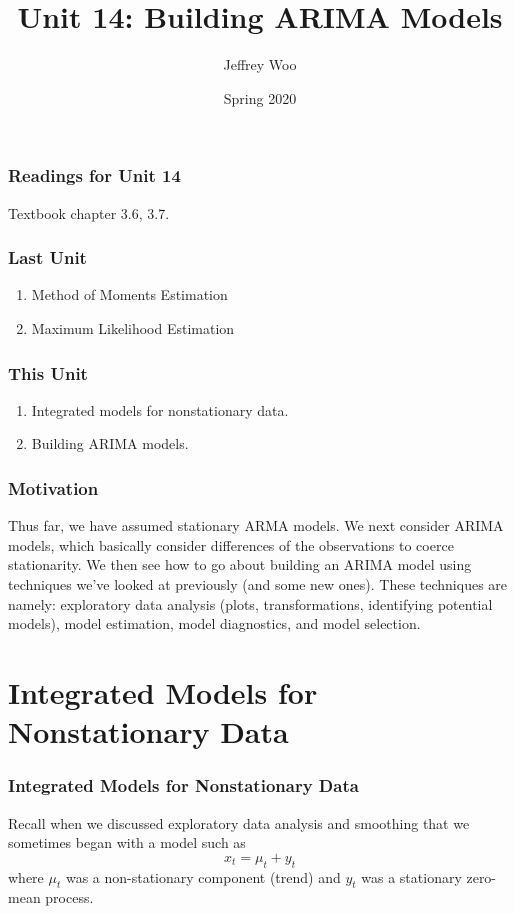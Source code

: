 \documentclass[%
xcolor=pdftex]{beamer}
\title{Unit 14: Building ARIMA Models}
\author[STAT 5170: Applied Time Series, Unit 14]{Jeffrey Woo}
\institute{Department of Statistics, University of Virginia}
\date{Spring 2020}
\begin{document}
\frame{\titlepage}


\begin{frame}
\frametitle{Readings for Unit 14}

Textbook chapter 3.6, 3.7.

\end{frame}



\begin{frame}
\frametitle{Last Unit}
\begin{enumerate}
\item Method of Moments Estimation
\item Maximum Likelihood Estimation
\end{enumerate}
\end{frame}

\begin{frame}
\frametitle{This Unit}
\begin{enumerate}
\item Integrated models for nonstationary data.
\item Building ARIMA models.
\end{enumerate}
\end{frame}


\begin{frame}
\frametitle{Motivation}

Thus far, we have assumed stationary ARMA models. We next consider ARIMA models, which basically consider differences of the observations to coerce stationarity. We then see how to go about building an ARIMA model using techniques we've looked at previously (and some new ones). These techniques are namely: exploratory data analysis (plots, transformations, identifying potential models), model estimation, model diagnostics, and model selection.

\end{frame}

\section{Integrated Models for Nonstationary Data}
\frame{\tableofcontents[currentsection]}

\begin{frame}
\frametitle{Integrated Models for Nonstationary Data}

Recall when we discussed exploratory data analysis and smoothing that we sometimes began with a model such as
 $$
 x_t=\mu_t + y_t
 $$
where $\mu_t$ was a non-stationary component (trend) and $y_t$ was a stationary zero-mean process.

\end{frame}
\end{document}
